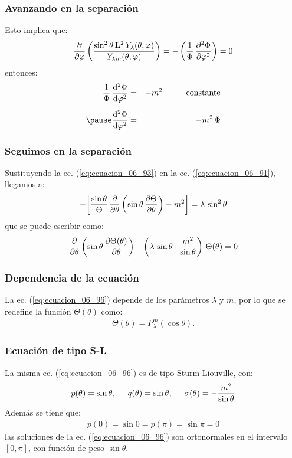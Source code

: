 \documentclass[12pt]{beamer}
\begin{document}
\begin{frame}
\frametitle{Avanzando en la separación}
Esto implica que:
\pause
\begin{align}
\pdv{\varphi} \left( \dfrac{\sin^{2} \theta \, \vb{L}^{2} \, Y_{\lambda} (\theta, \varphi)}{Y_{\lambda m} (\theta, \varphi)} \right) = - \left( \dfrac{1}{\Phi} \, \pdv[2]{\Phi}{\varphi} \right) = 0
\end{align}
\pause
entonces:
\pause
\begin{eqnarray}
\dfrac{1}{\Phi} \, \dv[2]{\Phi}{\varphi} &=& - m^{2} \hspace{1cm} \mbox{constante} \label{eq:ecuacion_06_93} \\[0.5em] \pause
\dv[2]{\Phi}{\varphi} &=& - m^{2} \, \Phi \label{eq:ecuacion_06_94}
\end{eqnarray}
\end{frame}
\begin{frame}
\frametitle{Seguimos en la separación}
Sustituyendo la ec. (\ref{eq:ecuacion_06_93}) en la ec. (\ref{eq:ecuacion_06_91}), llegamos a:
\begin{align}
- \bigg[ \dfrac{\sin \theta}{\Theta} \, \pdv{\theta} \left( \sin \theta \, \pdv{\Theta}{\theta} \right) - m^{2} \bigg] = \lambda \, \sin^{2} \theta
\label{eq:ecuacion_06_95}
\end{align}
\pause
que se puede escribir como:
\pause
\begin{align}
\pdv{\theta} \left( \sin \theta \, \pdv{\Theta (\theta)}{\theta} \right) {+} \left( \lambda \, \sin \theta {-} \dfrac{m^{2}}{\sin \theta} \right) \, \Theta (\theta) = 0
\label{eq:ecuacion_06_96}
\end{align}
\end{frame}
\begin{frame}
\frametitle{Dependencia de la ecuación}
La ec. (\ref{eq:ecuacion_06_96}) depende de los parámetros $\lambda$ y $m$, por lo que se redefine la función $\Theta(\theta)$ como:
\begin{align*}
\Theta(\theta) = P_{\lambda}^{m} (\cos \theta).
\end{align*}
\end{frame}
\begin{frame}
\frametitle{Ecuación de tipo S-L}
La misma ec. (\ref{eq:ecuacion_06_96}) es de tipo Sturm-Liouville, con:
\pause
\begin{align}
p(\theta) = \sin \theta, \hspace{0.5cm} q(\theta) = \sin \theta, \hspace{0.5cm} \sigma(\theta) = - \dfrac{m^{2}}{\sin \theta}
\label{eq:ecuacion_06_97}
\end{align}
\pause
Además se tiene que:
\pause
\begin{align*}
p(0) = \sin 0  = p(\pi) = \sin \pi = 0
\end{align*}
las soluciones de la ec. (\ref{eq:ecuacion_06_96}) son ortonormales en el intervalo $[0, \pi]$, con función de peso $\sin \theta$.
\end{frame}
\end{document}
